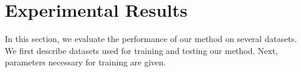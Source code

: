 \documentclass[10pt,twocolumn,letterpaper]{article}
\begin{document}
%
\section{Experimental Results}
In this section, we evaluate the performance of our method on several datasets. We first describe datasets used for training and testing our method. Next, parameters necessary for training are given. 
\end{document}
